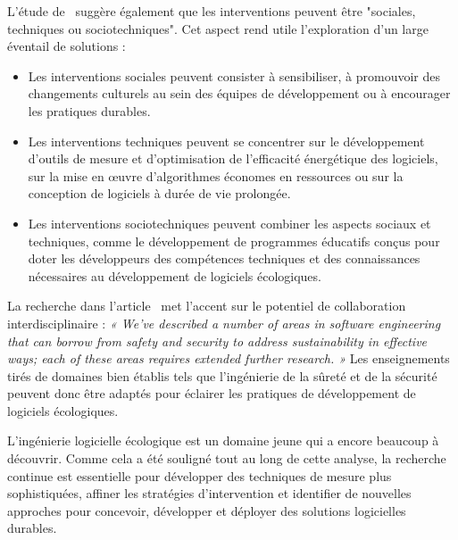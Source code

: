 L'étude de~\cite{SustainableStratifiedTheory} suggère également que les interventions peuvent être "sociales, techniques ou sociotechniques". Cet aspect rend utile l'exploration d'un large éventail de solutions :
\begin{itemize}
    \item Les interventions sociales peuvent consister à sensibiliser, à promouvoir des changements culturels au sein des équipes de développement ou à encourager les pratiques durables.
    \item Les interventions techniques peuvent se concentrer sur le développement d'outils de mesure et d'optimisation de l'efficacité énergétique des logiciels, sur la mise en œuvre d'algorithmes économes en ressources ou sur la conception de logiciels à durée de vie prolongée.
    \item Les interventions sociotechniques peuvent combiner les aspects sociaux et techniques, comme le développement de programmes éducatifs conçus pour doter les développeurs des compétences techniques et des connaissances nécessaires au développement de logiciels écologiques.
\end{itemize}


La recherche dans l'article~\cite{SafetySecuritySustainability} met l'accent sur le potentiel de collaboration interdisciplinaire : \emph{« We’ve described a number of areas in software engineering that can borrow from safety and security to address sustainability in effective ways; each of these areas requires extended further research. »} Les enseignements tirés de domaines bien établis tels que l'ingénierie de la sûreté et de la sécurité peuvent donc être adaptés pour éclairer les pratiques de développement de logiciels écologiques.


L'ingénierie logicielle écologique est un domaine jeune qui a encore beaucoup à découvrir. Comme cela a été souligné tout au long de cette analyse, la recherche continue est essentielle pour développer des techniques de mesure plus sophistiquées, affiner les stratégies d'intervention et identifier de nouvelles approches pour concevoir, développer et déployer des solutions logicielles durables.


